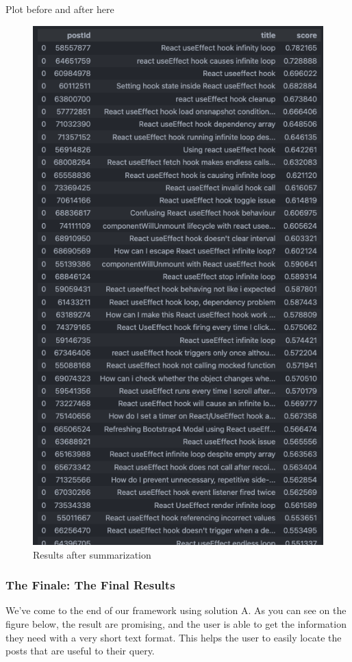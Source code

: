 Plot before and after here
\begin{figure}[H]
  \noindent \includegraphics[scale=0.45]{assets/spacy-query-1-results.png}
\caption{Results after summarization }\label{summarization_results}
\end{figure}

\pagebreak
\subsubsection{The Finale: The Final Results}
We've come to the end of our framework using solution A. As you can see on the figure below, the result are promising, and the user is able to get the information they need with a very short text format. This helps the user to easily locate the posts that are useful to their query.

